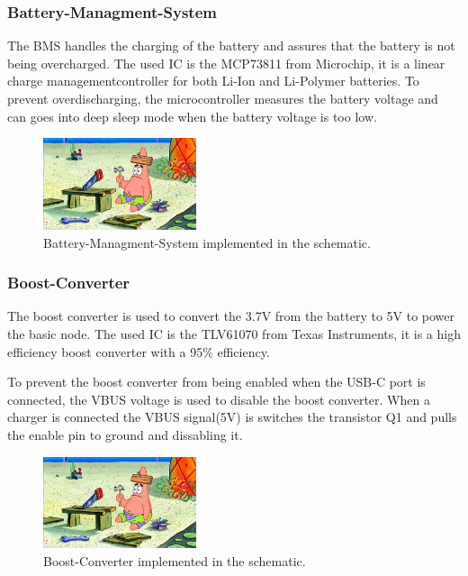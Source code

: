     \subsubsection{Battery-Managment-System}

        The BMS handles the charging of the battery and assures that the battery is not
        being overcharged. The used IC is the MCP73811 from Microchip, it is a linear 
        charge managementcontroller for both Li-Ion and Li-Polymer batteries. 
        To prevent overdischarging, the microcontroller measures the battery voltage
        and can goes into deep sleep mode when the battery voltage is too low.

        \begin{figure}[H]
        \centering
        \includegraphics[width=0.4\textwidth]{assets/HW/TBD.png}
        \caption{Battery-Managment-System implemented in the schematic.}
        \end{figure}

    \subsubsection{Boost-Converter}

        The boost converter is used to convert the 3.7V from the battery to 5V to power the 
        basic node. The used IC is the TLV61070 from Texas Instruments, it is a high efficiency
        boost converter with a 95\% efficiency.

        To prevent the boost converter from being enabled when the USB-C port is connected, the
        VBUS voltage is used to disable the boost converter. When a charger is connected
        the VBUS signal(5V) is switches the transistor Q1 and pulls the enable pin to ground 
        and dissabling it.
        
        \begin{figure}[H]
        \centering
        \includegraphics[width=0.4\textwidth]{assets/HW/TBD.png}
        \caption{Boost-Converter implemented in the schematic.}
        \end{figure}


